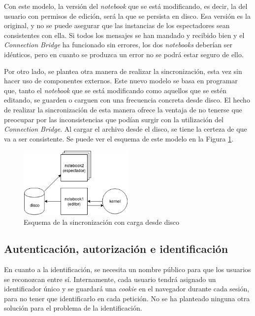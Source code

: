\documentclass[11pt,spanish,listoffigures]{tfgetsinf}
\begin{document}
Con este modelo, la versión del \textit{notebook} que se está modificando, es decir, la del usuario con permisos de edición, será la que se persista en disco. Esa versión es la original, y no se puede asegurar que las instancias de los espectadores sean consistentes con ella. Si todos los mensajes se han mandado y recibido bien y el \textit{Connection Bridge} ha funcionado sin errores, los dos \textit{notebooks} deberían ser idénticos, pero en cuanto se produzca un error no se podrá estar seguro de ello.

Por otro lado, se plantea otra manera de realizar la sincronización, esta vez sin hacer uso de componentes externos. Este nuevo modelo se basa en programar que, tanto el \textit{notebook} que se está modificando como aquellos que se estén editando, se guarden o carguen con una frecuencia concreta desde disco. El hecho de realizar la sincronización de esta manera ofrece la ventaja de no tenerse que preocupar por las inconsistencias que podían surgir con la utilización del \textit{Connection Bridge}. Al cargar el archivo desde el disco, se tiene la certeza de que va a ser consistente. Se puede ver el esquema de este modelo en la Figura \ref{fig:disk-scheme}.

\begin{figure}[h]
	\centering
  	\includegraphics[width=0.5\textwidth]{JSON-sync.png}
  	\caption{Esquema de la sincronización con carga desde disco}
  	\label{fig:disk-scheme}
\end{figure}


\subsection{Autenticación, autorización e identificación}
\label{subsec:identificacin-permisos}

En cuanto a la identificación, se necesita un nombre público para que los usuarios se reconozcan entre sí. Internamente, cada usuario tendrá asignado un identificador único y se guardará una \textit{\gls{cookie}} en el navegador durante cada sesión, para no tener que identificarlo en cada petición. No se ha planteado ninguna otra solución para el problema de la identificación.
\end{document}
